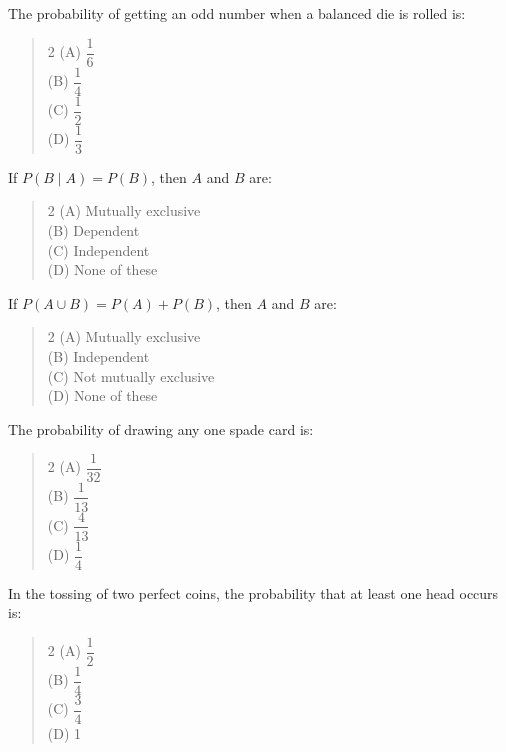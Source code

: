 \documentclass[11pt,a4paper]{article}
\begin{document}
\begin{mcqlist}
\item The probability of getting an odd number when a balanced die is rolled is:
\begin{quote}\begin{multicols}{2}
\noindent (A) $\dfrac{1}{6}$ \\
(B) $\dfrac{1}{4}$ \\
(C) $\dfrac{1}{2}$ \\
(D) $\dfrac{1}{3}$
\end{multicols}\end{quote}

\item If $P(B\mid A)=P(B)$, then $A$ and $B$ are:
\begin{quote}\begin{multicols}{2}
\noindent (A) Mutually exclusive \\
(B) Dependent \\
(C) Independent \\
(D) None of these
\end{multicols}\end{quote}

\item If $P(A\cup B)=P(A)+P(B)$, then $A$ and $B$ are:
\begin{quote}\begin{multicols}{2}
\noindent (A) Mutually exclusive \\
(B) Independent \\
(C) Not mutually exclusive \\
(D) None of these
\end{multicols}\end{quote}

\item The probability of drawing any one spade card is:
\begin{quote}\begin{multicols}{2}
\noindent (A) $\dfrac{1}{32}$ \\
(B) $\dfrac{1}{13}$ \\
(C) $\dfrac{4}{13}$ \\
(D) $\dfrac{1}{4}$
\end{multicols}\end{quote}

\item In the tossing of two perfect coins, the probability that at least one head occurs is:
\begin{quote}\begin{multicols}{2}
\noindent (A) $\dfrac{1}{2}$ \\
(B) $\dfrac{1}{4}$ \\
(C) $\dfrac{3}{4}$ \\
(D) 1
\end{multicols}\end{quote}


\end{mcqlist}
\end{document}
